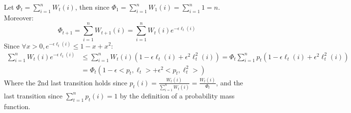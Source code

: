 Let $\Phi_t = \sum_{i=1}^n W_t(i)$, then since $\Phi_1 = \sum_{i=1}^n W_1(i) = \sum_{i=1}^n 1 = n$. 
Moreover:
\begin{equation*}
        \Phi_{t+1} = \sum_{i=1}^n W_{t+1}(i) = \sum_{i=1}^n W_t(i) e^{-\epsilon \ell_t(i)}
\end{equation*}
Since $\forall x>0, e^{-\epsilon \ell_t(i)} \leq 1 - x + x^2$:
\begin{equation*}
    \begin{split}
        \sum_{i=1}^n W_t(i) e^{-\epsilon \ell_t(i)} &\leq \sum_{i=1}^n W_t(i) (1 -\epsilon \ell_t(i) + \epsilon^2 \ell^2_t(i)) = \Phi_t \sum_{i=1}^n p_t (1 -\epsilon \ell_t(i) + \epsilon^2 \ell^2_t(i)) \\
        &= \Phi_t(1 - \epsilon <p_t, \ell_t> + \epsilon^2 <p_t, \ell^2_t>)
    \end{split}
\end{equation*}
Where the 2nd last transition holds since $p_t(i) = \frac{W_t(i)}{\sum_{i=1}^n W_t(i)} = \frac{W_t(i)}{\Phi_t}$, and the last transition since $\sum_{t=1}^n p_t(i) = 1$ by the definition of a probability mass function.

